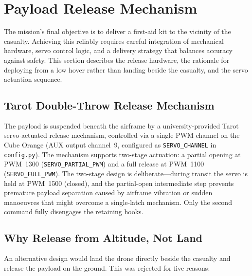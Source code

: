\section{Payload Release Mechanism}\label{sec:payload-release}

The mission's final objective is to deliver a first-aid kit to the vicinity of the casualty.  Achieving this reliably requires careful integration of mechanical hardware, servo control logic, and a delivery strategy that balances accuracy against safety.  This section describes the release hardware, the rationale for deploying from a low hover rather than landing beside the casualty, and the servo actuation sequence.

\subsection{Tarot Double-Throw Release Mechanism}

The payload is suspended beneath the airframe by a university-provided Tarot servo-actuated release mechanism, controlled via a single PWM channel on the Cube Orange (AUX output channel~9, configured as \texttt{SERVO\_CHANNEL} in \texttt{config.py}). The mechanism supports two-stage actuation: a partial opening at PWM~1300 (\texttt{SERVO\_PARTIAL\_PWM}) and a full release at PWM~1100 (\texttt{SERVO\_FULL\_PWM}). The two-stage design is deliberate---during transit the servo is held at PWM~1500 (closed), and the partial-open intermediate step prevents premature payload separation caused by airframe vibration or sudden manoeuvres that might overcome a single-latch mechanism. Only the second command fully disengages the retaining hooks.

\subsection{Why Release from Altitude, Not Land}

An alternative design would land the drone directly beside the casualty and release the payload on the ground. This was rejected for five reasons:

